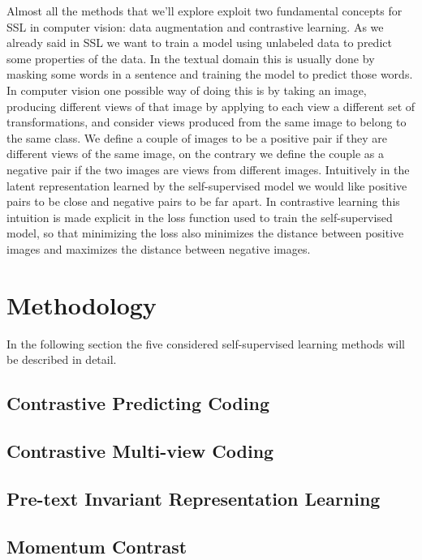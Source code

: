 \documentclass[12pt]{article}
\begin{document}
	Almost all the methods that we'll explore exploit two fundamental concepts for SSL in computer vision: data augmentation and contrastive learning. As we already said in SSL we want to train a model using unlabeled data to predict some properties of the data. In the textual domain this is usually done by masking some words in a sentence and training the model to predict those words. In computer vision one possible way of doing this is by taking an image, producing different views of that image by applying to each view a different set of transformations, and consider views produced from the same image to belong to the same class. We define a couple of images to be a positive pair if they are different views of the same image, on the contrary we define the couple as a negative pair if the two images are views from different images. Intuitively in the latent representation learned by the self-supervised model we would like positive pairs to be close and negative pairs to be far apart. In contrastive learning this intuition is made explicit in the loss function used to train the self-supervised model, so that minimizing the loss also minimizes the distance between positive images and maximizes the distance between negative images.

	
	\section{Methodology}
	In the following section the five considered self-supervised learning methods will be described in detail.

	\subsection*{Contrastive Predicting Coding}
	
	
	\subsection*{Contrastive Multi-view Coding}
	
	
	\subsection*{Pre-text Invariant Representation Learning}
	
	
	\subsection*{Momentum Contrast}
	
	
\end{document}
